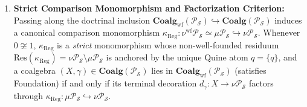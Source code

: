\begin{theorem}
\begin{enumerate}[label=\textup{(\roman*)},leftmargin=1.8em]
  \item \textbf{Strict Comparison Monomorphism and Factorization Criterion:} Passing along the doctrinal inclusion $\mathbf{Coalg}_{\mathrm{wf}}(\mathcal{P}_{\mathcal{S}}) \hookrightarrow \mathbf{Coalg}(\mathcal{P}_{\mathcal{S}})$ induces a canonical comparison monomorphism $\kappa_{\mathrm{Reg}} : \nu^{\mathrm{wf}} \mathcal{P}_{\mathcal{S}} \simeq \mu \mathcal{P}_{\mathcal{S}} \hookrightarrow \nu \mathcal{P}_{\mathcal{S}}$. Whenever $0 \not\cong 1$, $\kappa_{\mathrm{Reg}}$ is a \emph{strict} monomorphism whose non-well-founded residuum $\mathrm{Res}(\kappa_{\mathrm{Reg}}) = \nu \mathcal{P}_{\mathcal{S}} \setminus \mu \mathcal{P}_{\mathcal{S}}$ is anchored by the unique Quine atom $q = \{q\}$, and a coalgebra $(X, \gamma) \in \mathbf{Coalg}(\mathcal{P}_{\mathcal{S}})$ lies in $\mathbf{Coalg}_{\mathrm{wf}}(\mathcal{P}_{\mathcal{S}})$ (satisfies Foundation) if and only if its terminal decoration $d_\gamma : X \to \nu \mathcal{P}_{\mathcal{S}}$ factors through $\kappa_{\mathrm{Reg}} : \mu \mathcal{P}_{\mathcal{S}} \hookrightarrow \nu \mathcal{P}_{\mathcal{S}}$.
\end{enumerate}
\end{theorem}

